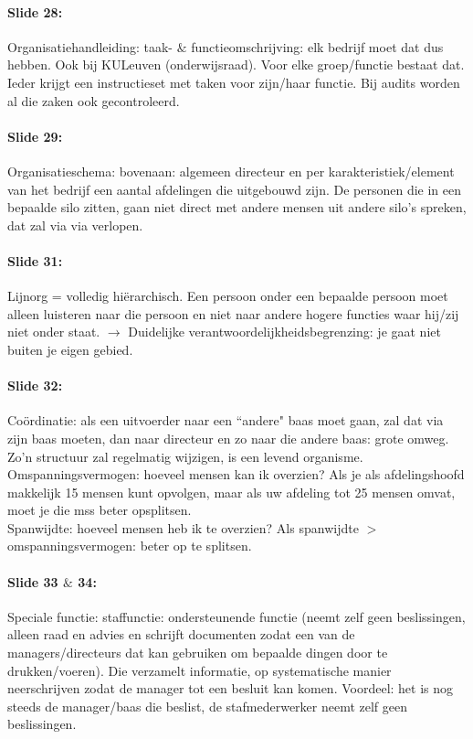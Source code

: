 \documentclass[10pt,a4paper]{report}
\begin{document}
\paragraph{Slide 28:} Organisatiehandleiding: taak- $\&$ functieomschrijving: elk bedrijf moet dat dus hebben. Ook bij KULeuven (onderwijsraad). Voor elke groep/functie bestaat dat. Ieder krijgt een instructieset met taken voor zijn/haar functie. Bij audits worden al die zaken ook gecontroleerd.

\paragraph{Slide 29:} Organisatieschema: bovenaan: algemeen directeur en per karakteristiek/element van het bedrijf een aantal afdelingen die uitgebouwd zijn. De personen die in een bepaalde silo zitten, gaan niet direct met andere mensen uit andere silo's spreken, dat zal via via verlopen.

\paragraph{Slide 31:} Lijnorg = volledig hi\"erarchisch. Een persoon onder een bepaalde persoon moet alleen luisteren naar die persoon en niet naar andere hogere functies waar hij/zij niet onder staat. $\rightarrow$ Duidelijke verantwoordelijkheidsbegrenzing: je gaat niet buiten je eigen gebied.

\paragraph{Slide 32:} Co\"ordinatie: als een uitvoerder naar een ``andere" baas moet gaan, zal dat via zijn baas moeten, dan naar directeur en zo naar die andere baas: grote omweg.
Zo'n structuur zal regelmatig wijzigen, is een levend organisme.\\
Omspanningsvermogen: hoeveel mensen kan ik overzien? Als je als afdelingshoofd makkelijk 15 mensen kunt opvolgen, maar als uw afdeling tot 25 mensen omvat, moet je die mss beter opsplitsen.\\
Spanwijdte: hoeveel mensen heb ik te overzien? Als spanwijdte $>$ omspanningsvermogen: beter op te splitsen.

\paragraph{Slide 33 $\&$ 34:} Speciale functie: staffunctie: ondersteunende functie (neemt zelf geen beslissingen, alleen raad en advies en schrijft documenten zodat een van de managers/directeurs dat kan gebruiken om bepaalde dingen door te drukken/voeren). Die verzamelt informatie, op systematische manier neerschrijven zodat de manager tot een besluit kan komen. Voordeel: het is nog steeds de manager/baas die beslist, de stafmederwerker neemt zelf geen beslissingen.
\end{document}
